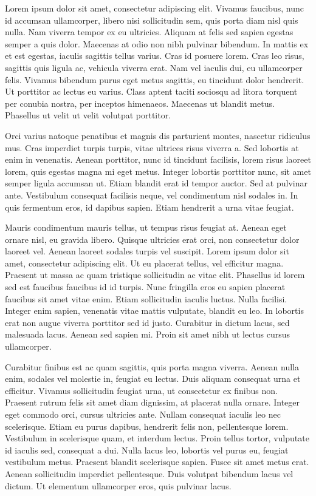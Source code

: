 Lorem ipsum dolor sit amet, consectetur adipiscing elit. Vivamus faucibus, nunc id accumsan ullamcorper, libero nisi sollicitudin sem, quis porta diam nisl quis nulla. Nam viverra tempor ex eu ultricies. Aliquam at felis sed sapien egestas semper a quis dolor. Maecenas at odio non nibh pulvinar bibendum. In mattis ex et est egestas, iaculis sagittis tellus varius. Cras id posuere lorem. Cras leo risus, sagittis quis ligula ac, vehicula viverra erat. Nam vel iaculis dui, eu ullamcorper felis. Vivamus bibendum purus eget metus sagittis, eu tincidunt dolor hendrerit. Ut porttitor ac lectus eu varius. Class aptent taciti sociosqu ad litora torquent per conubia nostra, per inceptos himenaeos. Maecenas ut blandit metus. Phasellus ut velit ut velit volutpat porttitor.

Orci varius natoque penatibus et magnis dis parturient montes, nascetur ridiculus mus. Cras imperdiet turpis turpis, vitae ultrices risus viverra a. Sed lobortis at enim in venenatis. Aenean porttitor, nunc id tincidunt facilisis, lorem risus laoreet lorem, quis egestas magna mi eget metus. Integer lobortis porttitor nunc, sit amet semper ligula accumsan ut. Etiam blandit erat id tempor auctor. Sed at pulvinar ante. Vestibulum consequat facilisis neque, vel condimentum nisl sodales in. In quis fermentum eros, id dapibus sapien. Etiam hendrerit a urna vitae feugiat.

Mauris condimentum mauris tellus, ut tempus risus feugiat at. Aenean eget ornare nisl, eu gravida libero. Quisque ultricies erat orci, non consectetur dolor laoreet vel. Aenean laoreet sodales turpis vel suscipit. Lorem ipsum dolor sit amet, consectetur adipiscing elit. Ut eu placerat tellus, vel efficitur magna. Praesent ut massa ac quam tristique sollicitudin ac vitae elit. Phasellus id lorem sed est faucibus faucibus id id turpis. Nunc fringilla eros eu sapien placerat faucibus sit amet vitae enim. Etiam sollicitudin iaculis luctus. Nulla facilisi. Integer enim sapien, venenatis vitae mattis vulputate, blandit eu leo. In lobortis erat non augue viverra porttitor sed id justo. Curabitur in dictum lacus, sed malesuada lacus. Aenean sed sapien mi. Proin sit amet nibh ut lectus cursus ullamcorper.

Curabitur finibus est ac quam sagittis, quis porta magna viverra. Aenean nulla enim, sodales vel molestie in, feugiat eu lectus. Duis aliquam consequat urna et efficitur. Vivamus sollicitudin feugiat urna, ut consectetur ex finibus non. Praesent rutrum felis sit amet diam dignissim, at placerat nulla ornare. Integer eget commodo orci, cursus ultricies ante. Nullam consequat iaculis leo nec scelerisque. Etiam eu purus dapibus, hendrerit felis non, pellentesque lorem. Vestibulum in scelerisque quam, et interdum lectus. Proin tellus tortor, vulputate id iaculis sed, consequat a dui. Nulla lacus leo, lobortis vel purus eu, feugiat vestibulum metus. Praesent blandit scelerisque sapien. Fusce sit amet metus erat. Aenean sollicitudin imperdiet pellentesque. Duis volutpat bibendum lacus vel dictum. Ut elementum ullamcorper eros, quis pulvinar lacus.

